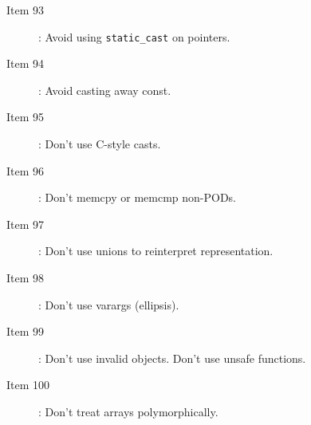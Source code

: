 \begin{description}
\begin{description}
  {}\item[Item 93]: Avoid using {}\texttt{static\_cast} on pointers.

  {}\item[Item 94]: Avoid casting away const.

  {}\item[Item 95]: Don't use C-style casts.

  {}\item[Item 96]: Don't memcpy or memcmp non-PODs.

  {}\item[Item 97]: Don't use unions to reinterpret representation.

  {}\item[Item 98]: Don't use varargs (ellipsis).

  {}\item[Item 99]: Don't use invalid objects. Don't use unsafe functions.

  {}\item[Item 100]: Don't treat arrays polymorphically.

  \end{description}

\end{description}
